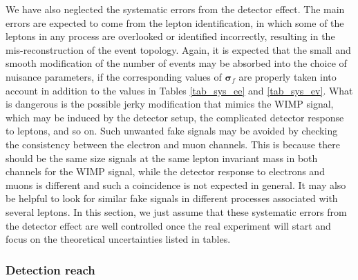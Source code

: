 \documentclass[12pt,twoside,book]{article}
\begin{document}
We have also neglected the systematic errors from the detector effect.
The main errors are expected to come from the lepton identification, in which some of the leptons in any process are overlooked or identified incorrectly, resulting in the mis-reconstruction of the event topology.
Again, it is expected that the small and smooth modification of the number of events may be absorbed into the choice of nuisance parameters, if the corresponding values of $\bm{\sigma}_f$ are properly taken into account in addition to the values in Tables
\ref{tab_sys_ee} and \ref{tab_sys_ev}.
What is dangerous is the possible jerky modification that mimics the WIMP signal, which may be induced by the detector setup, the complicated detector response to leptons, and so on.
Such unwanted fake signals may be avoided by checking the consistency between the electron and muon channels.
This is because there should be the same size signals at the same lepton invariant mass in both channels for the WIMP signal, while the detector response to electrons and muons is different and such a coincidence is not expected in general.
It may also be helpful to look for similar fake signals in different processes associated with several leptons.
In this section, we just assume that these systematic errors from the detector effect are well controlled once the real experiment will start and focus on the theoretical uncertainties listed in tables.


\subsubsection{Detection reach}
\label{sec_detection}
\end{document}
